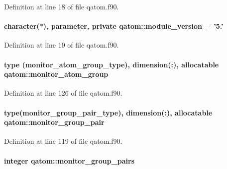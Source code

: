 Definition at line 18 of file qatom.\-f90.

\hypertarget{classqatom_af98e04952aced53fdd440012346897b2}{
\paragraph[{module\-\_\-version}]{\setlength{\rightskip}{0pt plus 5cm}character($\ast$), parameter, private qatom\-::module\-\_\-version = '5.'\hspace{0.3cm}{\ttfamily [private]}}}\label{classqatom_af98e04952aced53fdd440012346897b2}


Definition at line 19 of file qatom.\-f90.

\hypertarget{classqatom_a352dcbf92faa65e207f697f694626a05}{
\paragraph[{monitor\-\_\-atom\-\_\-group}]{\setlength{\rightskip}{0pt plus 5cm}type ({\bf monitor\-\_\-atom\-\_\-group\-\_\-type}), dimension(\-:), allocatable qatom\-::monitor\-\_\-atom\-\_\-group}}\label{classqatom_a352dcbf92faa65e207f697f694626a05}


Definition at line 126 of file qatom.\-f90.

\hypertarget{classqatom_ad8e7674c5d54028519bc6bf0a478b406}{
\paragraph[{monitor\-\_\-group\-\_\-pair}]{\setlength{\rightskip}{0pt plus 5cm}type({\bf monitor\-\_\-group\-\_\-pair\-\_\-type}), dimension(\-:), allocatable qatom\-::monitor\-\_\-group\-\_\-pair}}\label{classqatom_ad8e7674c5d54028519bc6bf0a478b406}


Definition at line 119 of file qatom.\-f90.

\hypertarget{classqatom_ab181049f3af87e317940072e8dcb0b8c}{
\paragraph[{monitor\-\_\-group\-\_\-pairs}]{\setlength{\rightskip}{0pt plus 5cm}integer qatom\-::monitor\-\_\-group\-\_\-pairs}}\label{classqatom_ab181049f3af87e317940072e8dcb0b8c}


